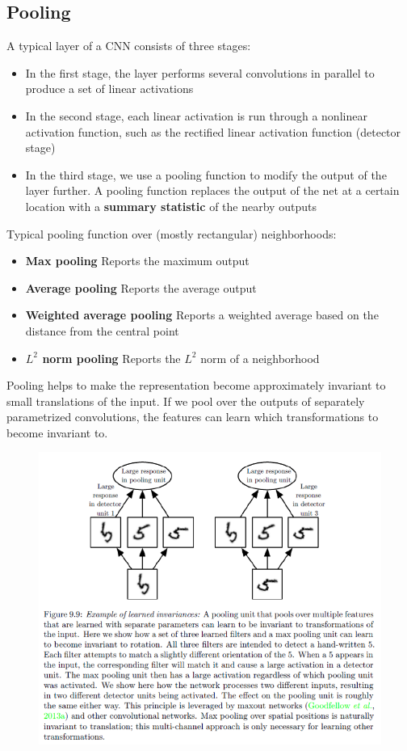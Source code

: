 \begin{multicols}{2}
	\subsection{Pooling}
	A typical layer of a CNN consists of three stages:
	\begin{itemize}
		\item In the first stage, the layer performs several convolutions in parallel to produce a set of linear activations
		\item In the second stage, each linear activation is run through a nonlinear activation function, such as the rectified linear activation function (detector stage)
		\item In the third stage, we use a pooling function to modify the output of the layer further. A pooling function replaces the output of the net at a certain location with a \textbf{summary statistic} of the nearby outputs
	\end{itemize}
	Typical pooling function over (mostly rectangular) neighborhoods:
	\begin{itemize}
		\item \textbf{Max pooling} Reports the maximum output
		\item\textbf{Average pooling} Reports the average output
		\item\textbf{Weighted average pooling} Reports a weighted average based on the distance from the central point
		\item\textbf{$L^2$ norm pooling} Reports the $L^2$ norm of a neighborhood
	\end{itemize}
	Pooling helps to make the representation become approximately invariant to small translations of the input.
	If we pool over the outputs of separately parametrized convolutions, the features can learn which transformations to become invariant to.
	\begin{figure}[H]
		\centering
		\includegraphics[width=0.8\linewidth]{images/pooling.png}

\end{figure}
\end{multicols}
